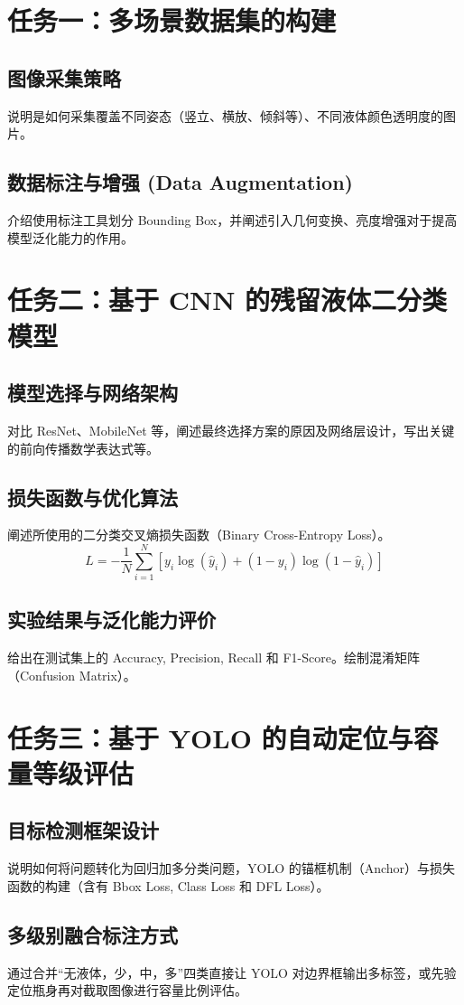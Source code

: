 \documentclass[12pt,a4paper,UTF8]{ctexart}
\begin{document}
\section{任务一：多场景数据集的构建}
\subsection{图像采集策略}
说明是如何采集覆盖不同姿态（竖立、横放、倾斜等）、不同液体颜色透明度的图片。
\subsection{数据标注与增强 (Data Augmentation)}
介绍使用标注工具划分 Bounding Box，并阐述引入几何变换、亮度增强对于提高模型泛化能力的作用。

\section{任务二：基于 CNN 的残留液体二分类模型}
\subsection{模型选择与网络架构}
对比 ResNet、MobileNet 等，阐述最终选择方案的原因及网络层设计，写出关键的前向传播数学表达式等。
\subsection{损失函数与优化算法}
阐述所使用的二分类交叉熵损失函数（Binary Cross-Entropy Loss）。
$$ L = -\frac{1}{N}\sum_{i=1}^{N}[y_i \log(\hat{y}_i) + (1-y_i)\log(1-\hat{y}_i)] $$
\subsection{实验结果与泛化能力评价}
给出在测试集上的 Accuracy, Precision, Recall 和 F1-Score。绘制混淆矩阵（Confusion Matrix）。

\section{任务三：基于 YOLO 的自动定位与容量等级评估}
\subsection{目标检测框架设计}
说明如何将问题转化为回归加多分类问题，YOLO 的锚框机制（Anchor）与损失函数的构建（含有 Bbox Loss, Class Loss 和 DFL Loss）。
\subsection{多级别融合标注方式}
通过合并“无液体，少，中，多”四类直接让 YOLO 对边界框输出多标签，或先验定位瓶身再对截取图像进行容量比例评估。
\end{document}
